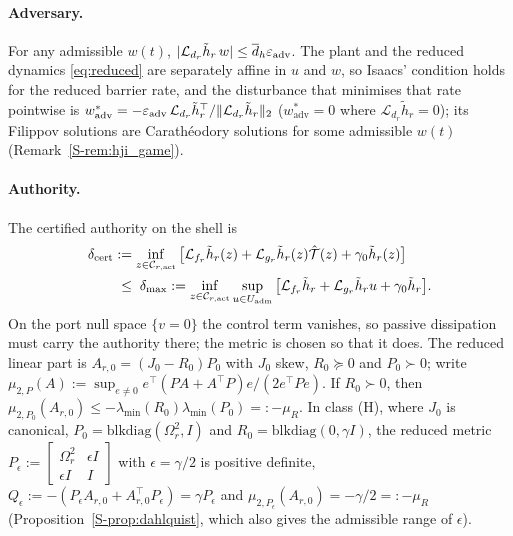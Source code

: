 \paragraph{Adversary.}
For any admissible $w(t)$, $|\mathcal{L}_{d_r}\tilde h_r\,w| \le \overline{d}_h\varepsilon_{\mathrm{adv}}$. The plant and the reduced dynamics \eqref{eq:reduced} are separately affine in $u$ and $w$, so Isaacs' condition holds for the reduced barrier rate, and the disturbance that minimises that rate pointwise is $w^*_{\mathrm{adv}} = -\varepsilon_{\mathrm{adv}}\,\mathcal{L}_{d_r}\tilde h_r^\top/\|\mathcal{L}_{d_r}\tilde h_r\|_2$ ($w^*_{\mathrm{adv}} = 0$ where $\mathcal{L}_{d_r}\tilde h_r = 0$); its Filippov solutions are Carath\'eodory solutions for some admissible $w(t)$ (Remark~\ref{S-rem:hji_game}).

\paragraph{Authority.}
The certified authority on the shell is
\begin{equation}
\label{eq:dcert}
\begin{aligned}
\delta_{\mathrm{cert}} &:= \inf_{z \in \mathcal{C}_{r,\mathrm{act}}}\big[\mathcal{L}_{f_r}\tilde h_r(z) + \mathcal{L}_{g_r}\tilde h_r(z)\hat{\mathcal{T}}(z) + \gamma_0\tilde h_r(z)\big]\\
&\;\le\; \delta_{\max} := \inf_{z\in\mathcal{C}_{r,\mathrm{act}}}\sup_{u\in U_{\mathrm{adm}}}\big[\mathcal{L}_{f_r}\tilde h_r + \mathcal{L}_{g_r}\tilde h_r u + \gamma_0\tilde h_r\big].
\end{aligned}
\end{equation}
On the port null space $\{v = 0\}$ the control term vanishes, so passive dissipation must carry the authority there; the metric is chosen so that it does. The reduced linear part is $A_{r,0} = (J_0 - R_0)P_0$ with $J_0$ skew, $R_0 \succeq 0$ and $P_0 \succ 0$; write $\mu_{2,P}(A) := \sup_{e \ne 0} e^\top(PA + A^\top P)e/(2e^\top Pe)$. If $R_0 \succ 0$, then $\mu_{2,P_0}(A_{r,0}) \le -\lambda_{\min}(R_0)\lambda_{\min}(P_0) =: -\mu_R$. In class (H), where $J_0$ is canonical, $P_0 = \mathrm{blkdiag}(\Omega_r^2, I)$ and $R_0 = \mathrm{blkdiag}(0, \gamma I)$, the reduced metric $P_\epsilon := \left[\begin{smallmatrix}\Omega_r^2 & \epsilon I\\ \epsilon I & I\end{smallmatrix}\right]$ with $\epsilon = \gamma/2$ is positive definite, $Q_\epsilon := -(P_\epsilon A_{r,0} + A_{r,0}^\top P_\epsilon) = \gamma P_\epsilon$ and $\mu_{2,P_\epsilon}(A_{r,0}) = -\gamma/2 =: -\mu_R$ (Proposition~\ref{S-prop:dahlquist}, which also gives the admissible range of $\epsilon$).

